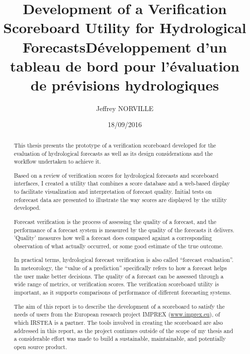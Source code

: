 \documentclass[logos,parttoc,morelanguage=french,morelanguage=german,draft]{orsay-memoire}
\author{Jeffrey \textsc{NORVILLE}}
\title{Development of a Verification Scoreboard Utility for Hydrological Forecasts}
\title[french]{Développement d’un tableau de bord pour l’évaluation de prévisions hydrologiques}
\date{18/09/2016} %
\begin{document}
\maketitle%

\pagestyle{empty}


\begin{abstract}
This thesis presents the prototype of a verification scoreboard developed for the evaluation of hydrological forecasts as well as its design considerations and the workflow undertaken to achieve it.

Based on a review of verification scores for hydrological forecasts and scoreboard interfaces, I created a utility that combines a score database and a web-based display to facilitate visualization and interpretation of forecast quality. Initial tests on reforecast data are presented to illustrate the way scores are displayed by the utility developed.

Forecast verification is the process of assessing the quality of a forecast, and the performance of a forecast system is measured by the quality of the forecasts it delivers. 'Quality' measures how well a forecast does compared against a corresponding observation of what actually occurred, or some good estimate of the true outcome. 

In practical terms, hydrological forecast verification is also called ``forecast evaluation''. In meteorology, the ``value of a prediction'' specifically refers to how a forecast helps the user make better decisions. The quality of a forecast can be assessed through a wide range of metrics, or verification scores. The verification scoreboard utility is important, as it supports comparisons of performance of different forecasting systems.

The aim of this report is to describe the development of a scoreboard to satisfy the needs of users from the European research project IMPREX (\href{http://www.imprex.eu/}{www.imprex.eu}), of which IRSTEA is a partner. The tools involved in creating the scoreboard are also addressed in this report, as the project continues outside of the scope of my thesis and a considerable effort was made to build a sustainable, maintainable, and potentially open source product.
\end{abstract}
\end{document}
